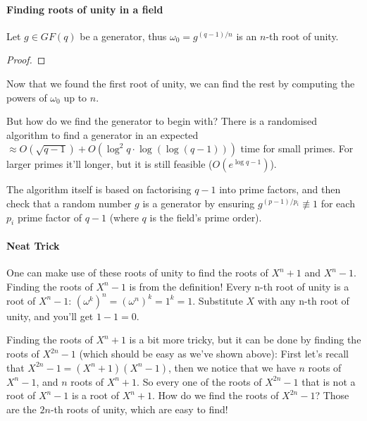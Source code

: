 \paragraph{Finding roots of unity in a field}

\begin{thm}
  Let $g\in GF(q)$ be a generator, thus
  $\omega_0=g^{(q-1)/n}$ is an $n$-th root of unity.
\end{thm}
\begin{proof}
\end{proof}

Now that we found the first root of unity,
we can find the rest by computing the powers of $\omega_0$ up to $n$.


But how do we find the generator to begin with? 
There is a randomised algorithm to find a generator in an expected 
$\approx O(\sqrt{q-1})+O(\log^2{q}\cdot \log (\log(q-1)))$ time for small primes.
For larger primes it'll longer, but it is still feasible ($O(e^{\log q-1})$).

The algorithm itself is based on factorising $q-1$ into prime factors, and then
check that a random number $g$ is a generator by ensuring $g^{(p-1)/p_i} \not\equiv 1$
for each $p_i$ prime factor of $q-1$ (where $q$ is the field's prime order).


\paragraph{Neat Trick}
One can make use of these roots of unity to find the roots of $X^n+1$ and $X^n-1$.
Finding the roots of $X^n-1$ is from the definition! 
Every n-th root of unity is a root of $X^n-1$: $(\omega^k)^n=(\omega^n)^k=1^k=1$.
Substitute $X$ with any n-th root of unity, and you'll get $1-1=0$.

Finding the roots of $X^n+1$ is a bit more tricky,
but it can be done by finding the roots of $X^{2n}-1$ (which should be easy
as we've shown above):
First let's recall that $X^{2n}-1=(X^n+1)(X^n-1)$, then we notice that
we have $n$ roots of $X^n-1$,
and $n$ roots of $X^n+1$. So every one of the roots of $X^{2n}-1$ that is
not a root of $X^n-1$ is a root of $X^n+1$.
How do we find the roots of $X^{2n}-1$? Those are the $2n$-th roots of unity, 
which are easy to find!

